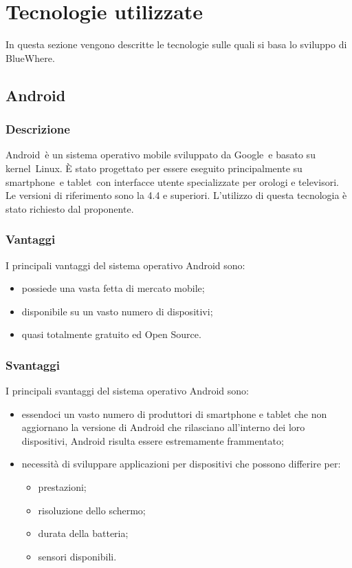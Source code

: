 \documentclass[../SpecificaTecnica.tex]{subfiles}
\begin{document}
\section{Tecnologie utilizzate}
	In questa sezione vengono descritte le tecnologie sulle quali si basa lo sviluppo di BlueWhere.
	\subsection{Android}
		\subsubsection{Descrizione}
			Android\g\ è un sistema operativo mobile sviluppato da Google\g\ e basato su kernel\g\ Linux\g. È stato progettato per essere eseguito principalmente su smartphone\g\ e tablet\g\, con interfacce utente specializzate per orologi e televisori. Le versioni di riferimento sono la 4.4 e superiori. L'utilizzo di questa tecnologia è stato richiesto dal proponente.
		\subsubsection{Vantaggi}
			I principali vantaggi del sistema operativo Android sono:
			\begin{itemize}
				\item possiede una vasta fetta di mercato mobile;
				\item disponibile su un vasto numero di dispositivi;
				\item quasi totalmente gratuito ed Open Source\g.
			\end{itemize}
		\subsubsection{Svantaggi}
			I principali svantaggi del sistema operativo Android sono:
			\begin{itemize}
				\item essendoci un vasto numero di produttori di smartphone e tablet che non aggiornano la versione di Android che rilasciano all'interno dei loro dispositivi, Android risulta essere estremamente frammentato;
				\item necessità di sviluppare applicazioni per dispositivi che possono differire per:
					\begin{itemize}
						\item prestazioni;
						\item risoluzione dello schermo;
						\item durata della batteria;
						\item sensori disponibili.
					\end{itemize}
			\end{itemize}
\end{document}
